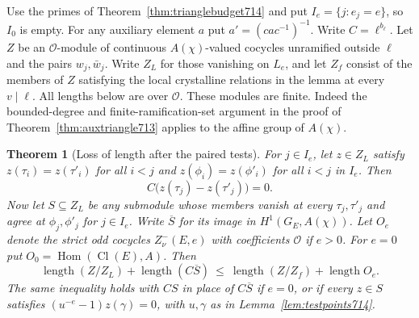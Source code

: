\documentclass[a4paper,11pt]{article}
\newtheorem{theorem}[proposition]{Theorem}
\theoremstyle{definition}
\theoremstyle{remark}
\newcommand{\len}{\operatorname{length}}\newcommand{\Res}{\operatorname*{Res}}
\numberwithin{equation}{section}
\begin{document}
Use the primes of Theorem~\ref{thm:trianglebudget714} and put
\(I_e=\{j:e_j=e\}\), so \(I_0\) is empty. For any auxiliary
element \(a\) put \(a'=(cac^{-1})^{-1}\).
Write \(C=\ell^{b_\ell}\). Let \(Z\) be an \(\mathcal O\)-module
of continuous \(A(\chi)\)-valued cocycles unramified outside
\(\ell\) and the pairs \(w_j,\bar w_j\). Write \(Z_L\) for
those vanishing on \(L_e\), and let \(Z_f\) consist of the
members of \(Z\) satisfying the local crystalline relations
in the lemma at every \(v\mid\ell\). All lengths below are
over \(\mathcal O\). These modules are finite. Indeed the
bounded-degree and finite-ramification-set argument in the
proof of Theorem~\ref{thm:auxtriangle713} applies to the
affine group of \(A(\chi)\).

\begin{theorem}[Loss of length after the paired tests]
\leavevmode\label{thm:scalarcost717}
For \(j\in I_e\), let \(z\in Z_L\) satisfy
\(z(\tau_i)=z(\tau'_i)\) for all \(i<j\) and
\(z(\phi_i)=z(\phi'_i)\) for all \(i<j\) in \(I_e\).
Then
\[
              C\bigl(z(\tau_j)-z(\tau'_j)\bigr)=0 .
\]
Now let \(S\subseteq Z_L\) be any submodule whose members
vanish at every \(\tau_j,\tau'_j\) and agree at
\(\phi_j,\phi'_j\) for \(j\in I_e\).
Write \(\overline S\) for its image in
\(H^1(G_E,A(\chi))\). Let \(O_e\) denote the strict odd
cocycles \(Z^-_\nu(E,e)\) with coefficients \(\mathcal O\)
if \(e>0\). For \(e=0\) put \(O_0=\operatorname{Hom}
(\operatorname{Cl}(E),A)\). Then
\[
       \len(Z/Z_L)+\len(C\overline S)
           \ \le\ \len(Z/Z_f)+\len O_e .
\]
The same inequality holds with \(CS\) in place of
\(C\overline S\) if \(e=0\), or if every \(z\in S\) satisfies
\((u^{-e}-1)z(\gamma)=0\), with \(u,\gamma\) as in
Lemma~\ref{lem:testpoints714}.
\end{theorem}
\end{document}
